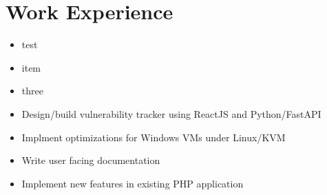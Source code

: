 \documentclass{resume}
\begin{document}
\section{Work Experience}

\begin{itemize}
    \item test
    \item item
    \item three
\end{itemize}

\begin{itemize}
    \item Design/build vulnerability tracker using ReactJS and Python/FastAPI
    \item Implment optimizations for Windows VMs under Linux/KVM
    \item Write user facing documentation
    \item Implement new features in existing PHP application
\end{itemize}
\end{document}
